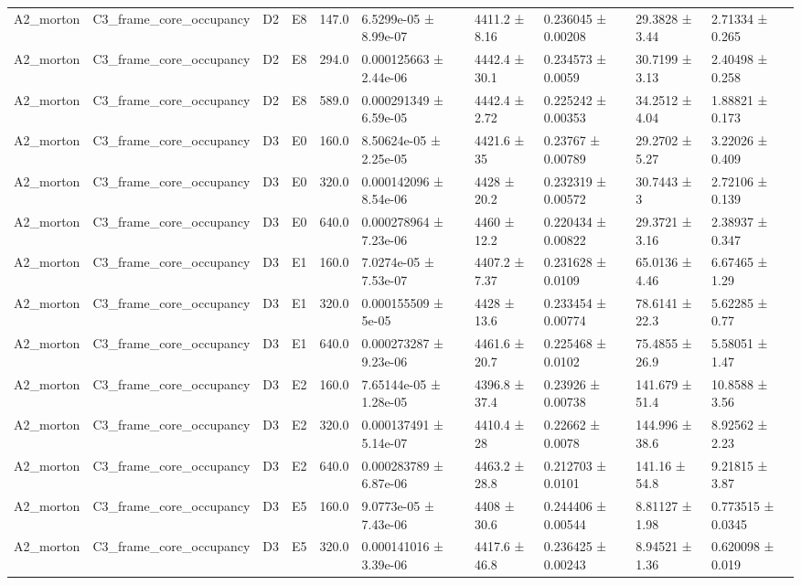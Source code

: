 \begin{table}
\begin{tabular}{llllllllll}
A2\_morton & C3\_frame\_core\_occupancy & D2 & E8 & 147.0 & 6.5299e-05 ± 8.99e-07 & 4411.2 ± 8.16 & 0.236045 ± 0.00208 & 29.3828 ± 3.44 & 2.71334 ± 0.265 \\
A2\_morton & C3\_frame\_core\_occupancy & D2 & E8 & 294.0 & 0.000125663 ± 2.44e-06 & 4442.4 ± 30.1 & 0.234573 ± 0.0059 & 30.7199 ± 3.13 & 2.40498 ± 0.258 \\
A2\_morton & C3\_frame\_core\_occupancy & D2 & E8 & 589.0 & 0.000291349 ± 6.59e-05 & 4442.4 ± 2.72 & 0.225242 ± 0.00353 & 34.2512 ± 4.04 & 1.88821 ± 0.173 \\
A2\_morton & C3\_frame\_core\_occupancy & D3 & E0 & 160.0 & 8.50624e-05 ± 2.25e-05 & 4421.6 ± 35 & 0.23767 ± 0.00789 & 29.2702 ± 5.27 & 3.22026 ± 0.409 \\
A2\_morton & C3\_frame\_core\_occupancy & D3 & E0 & 320.0 & 0.000142096 ± 8.54e-06 & 4428 ± 20.2 & 0.232319 ± 0.00572 & 30.7443 ± 3 & 2.72106 ± 0.139 \\
A2\_morton & C3\_frame\_core\_occupancy & D3 & E0 & 640.0 & 0.000278964 ± 7.23e-06 & 4460 ± 12.2 & 0.220434 ± 0.00822 & 29.3721 ± 3.16 & 2.38937 ± 0.347 \\
A2\_morton & C3\_frame\_core\_occupancy & D3 & E1 & 160.0 & 7.0274e-05 ± 7.53e-07 & 4407.2 ± 7.37 & 0.231628 ± 0.0109 & 65.0136 ± 4.46 & 6.67465 ± 1.29 \\
A2\_morton & C3\_frame\_core\_occupancy & D3 & E1 & 320.0 & 0.000155509 ± 5e-05 & 4428 ± 13.6 & 0.233454 ± 0.00774 & 78.6141 ± 22.3 & 5.62285 ± 0.77 \\
A2\_morton & C3\_frame\_core\_occupancy & D3 & E1 & 640.0 & 0.000273287 ± 9.23e-06 & 4461.6 ± 20.7 & 0.225468 ± 0.0102 & 75.4855 ± 26.9 & 5.58051 ± 1.47 \\
A2\_morton & C3\_frame\_core\_occupancy & D3 & E2 & 160.0 & 7.65144e-05 ± 1.28e-05 & 4396.8 ± 37.4 & 0.23926 ± 0.00738 & 141.679 ± 51.4 & 10.8588 ± 3.56 \\
A2\_morton & C3\_frame\_core\_occupancy & D3 & E2 & 320.0 & 0.000137491 ± 5.14e-07 & 4410.4 ± 28 & 0.22662 ± 0.0078 & 144.996 ± 38.6 & 8.92562 ± 2.23 \\
A2\_morton & C3\_frame\_core\_occupancy & D3 & E2 & 640.0 & 0.000283789 ± 6.87e-06 & 4463.2 ± 28.8 & 0.212703 ± 0.0101 & 141.16 ± 54.8 & 9.21815 ± 3.87 \\
A2\_morton & C3\_frame\_core\_occupancy & D3 & E5 & 160.0 & 9.0773e-05 ± 7.43e-06 & 4408 ± 30.6 & 0.244406 ± 0.00544 & 8.81127 ± 1.98 & 0.773515 ± 0.0345 \\
A2\_morton & C3\_frame\_core\_occupancy & D3 & E5 & 320.0 & 0.000141016 ± 3.39e-06 & 4417.6 ± 46.8 & 0.236425 ± 0.00243 & 8.94521 ± 1.36 & 0.620098 ± 0.019 \\

\end{tabular}
\end{table}

